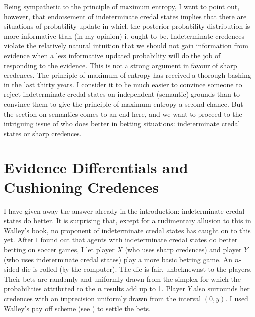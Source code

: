 Being sympathetic to the principle of maximum entropy,
I want to point out, however, that endorsement of
indeterminate credal states implies that there are
situations of probability update in which the posterior
probability distribution is more informative than (in
my opinion) it ought to be. Indeterminate credences
violate the relatively natural intuition that we should
not gain information from evidence when a less
informative updated probability will do the job of
responding to the evidence. This is not a strong
argument in favour of sharp credences. The principle of
maximum of entropy has received a thorough bashing in
the last thirty years. I consider it to be much easier
to convince someone to reject indeterminate credal
states on independent (semantic) grounds than to
convince them to give the principle of maximum entropy
a second chance. But the section on semantics comes to
an end here, and we want to proceed to the intriguing
issue of who does better in betting situations:
indeterminate credal states or sharp credences.

\section{Evidence Differentials and Cushioning
  Credences}
\label{WalleysWorldCupWoes}

I have given away the answer already in the
introduction: indeterminate credal states do better. It
is surprising that, except for a rudimentary allusion
to this in Walley's book, no proponent of indeterminate
credal states has caught on to this yet. After I found
out that agents with indeterminate credal states do
better betting on soccer games, I let player $X$ (who
uses sharp credences) and player $Y$ (who uses
indeterminate credal states) play a more basic betting
game. An $n$-sided die is rolled (by the computer). The
die is fair, unbeknownst to the players. Their bets are
randomly and uniformly drawn from the simplex for which
the probabilities attributed to the $n$ results add up
to 1. Player $Y$ also surrounds her credences with an
imprecision uniformly drawn from the interval $(0,y)$.
I used Walley's pay off scheme (see
) to settle the bets.

